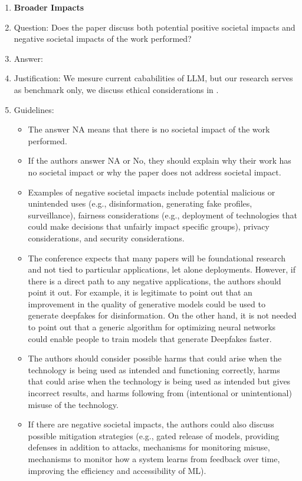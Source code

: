 \documentclass{article}
\begin{document}
\begin{enumerate}
\item {\bf Broader Impacts}
    \item[] Question: Does the paper discuss both potential positive societal impacts and negative societal impacts of the work performed?
    \item[] Answer: \answerYes{} %
    \item[] Justification: We mesure current cababilities of LLM, but our research serves as benchmark only, we discuss ethical considerations in .
    \item[] Guidelines:
    \begin{itemize}
        \item The answer NA means that there is no societal impact of the work performed.
        \item If the authors answer NA or No, they should explain why their work has no societal impact or why the paper does not address societal impact.
        \item Examples of negative societal impacts include potential malicious or unintended uses (e.g., disinformation, generating fake profiles, surveillance), fairness considerations (e.g., deployment of technologies that could make decisions that unfairly impact specific groups), privacy considerations, and security considerations.
        \item The conference expects that many papers will be foundational research and not tied to particular applications, let alone deployments. However, if there is a direct path to any negative applications, the authors should point it out. For example, it is legitimate to point out that an improvement in the quality of generative models could be used to generate deepfakes for disinformation. On the other hand, it is not needed to point out that a generic algorithm for optimizing neural networks could enable people to train models that generate Deepfakes faster.
        \item The authors should consider possible harms that could arise when the technology is being used as intended and functioning correctly, harms that could arise when the technology is being used as intended but gives incorrect results, and harms following from (intentional or unintentional) misuse of the technology.
        \item If there are negative societal impacts, the authors could also discuss possible mitigation strategies (e.g., gated release of models, providing defenses in addition to attacks, mechanisms for monitoring misuse, mechanisms to monitor how a system learns from feedback over time, improving the efficiency and accessibility of ML).
    \end{itemize}
    

\end{enumerate}
\end{document}
